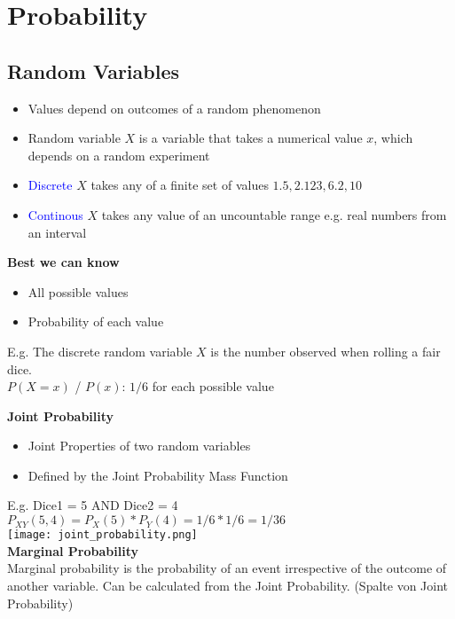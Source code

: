 \section{Probability}
\subsection{Random Variables}
\begin{itemize}
    \item Values depend on outcomes of a random phenomenon
    \item Random variable $X$ is a variable that takes a numerical value $x$, which depends on a random experiment
    \item \textcolor{blue}{Discrete} $X$ takes any of a finite set of values ${1.5, 2.123, 6.2, 10}$
    \item \textcolor{blue}{Continous} $X$ takes any value of an uncountable range e.g. real numbers from an interval
\end{itemize}
\textbf{Best we can know}
\begin{itemize}
    \item All possible values
    \item Probability of each value
\end{itemize}
E.g. The discrete random variable $X$ is the number observed when rolling a fair dice.\\
$P(X=x)$ / $P(x)$: $1/6$ for each possible value

\textbf{Joint Probability}
\begin{itemize}
    \item Joint Properties of two random variables
    \item Defined by the Joint Probability Mass Function
\end{itemize}
E.g. Dice1 = 5 AND Dice2 = 4\\
$P_{XY}(5,4) = P_X(5) * P_Y(4) = 1/6 * 1/6 = 1/36$\\
\texttt{[image: joint\_probability.png]} \\

\textbf{Marginal Probability} \\
Marginal probability is the probability of an event irrespective of
the outcome of another variable. Can be calculated from the
Joint Probability. (Spalte von Joint Probability) \\

